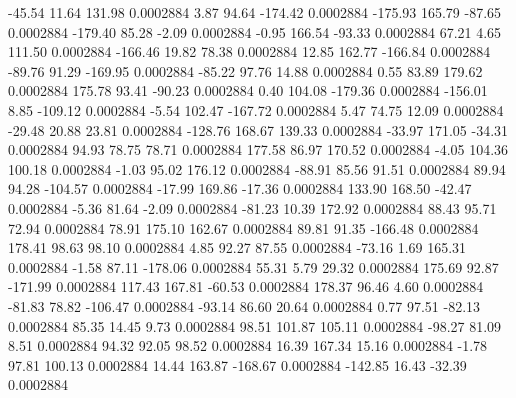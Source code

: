      -45.54       11.64      131.98     0.0002884
        3.87       94.64     -174.42     0.0002884
     -175.93      165.79      -87.65     0.0002884
     -179.40       85.28       -2.09     0.0002884
       -0.95      166.54      -93.33     0.0002884
       67.21        4.65      111.50     0.0002884
     -166.46       19.82       78.38     0.0002884
       12.85      162.77     -166.84     0.0002884
      -89.76       91.29     -169.95     0.0002884
      -85.22       97.76       14.88     0.0002884
        0.55       83.89      179.62     0.0002884
      175.78       93.41      -90.23     0.0002884
        0.40      104.08     -179.36     0.0002884
     -156.01        8.85     -109.12     0.0002884
       -5.54      102.47     -167.72     0.0002884
        5.47       74.75       12.09     0.0002884
      -29.48       20.88       23.81     0.0002884
     -128.76      168.67      139.33     0.0002884
      -33.97      171.05      -34.31     0.0002884
       94.93       78.75       78.71     0.0002884
      177.58       86.97      170.52     0.0002884
       -4.05      104.36      100.18     0.0002884
       -1.03       95.02      176.12     0.0002884
      -88.91       85.56       91.51     0.0002884
       89.94       94.28     -104.57     0.0002884
      -17.99      169.86      -17.36     0.0002884
      133.90      168.50      -42.47     0.0002884
       -5.36       81.64       -2.09     0.0002884
      -81.23       10.39      172.92     0.0002884
       88.43       95.71       72.94     0.0002884
       78.91      175.10      162.67     0.0002884
       89.81       91.35     -166.48     0.0002884
      178.41       98.63       98.10     0.0002884
        4.85       92.27       87.55     0.0002884
      -73.16        1.69      165.31     0.0002884
       -1.58       87.11     -178.06     0.0002884
       55.31        5.79       29.32     0.0002884
      175.69       92.87     -171.99     0.0002884
      117.43      167.81      -60.53     0.0002884
      178.37       96.46        4.60     0.0002884
      -81.83       78.82     -106.47     0.0002884
      -93.14       86.60       20.64     0.0002884
        0.77       97.51      -82.13     0.0002884
       85.35       14.45        9.73     0.0002884
       98.51      101.87      105.11     0.0002884
      -98.27       81.09        8.51     0.0002884
       94.32       92.05       98.52     0.0002884
       16.39      167.34       15.16     0.0002884
       -1.78       97.81      100.13     0.0002884
       14.44      163.87     -168.67     0.0002884
     -142.85       16.43      -32.39     0.0002884
